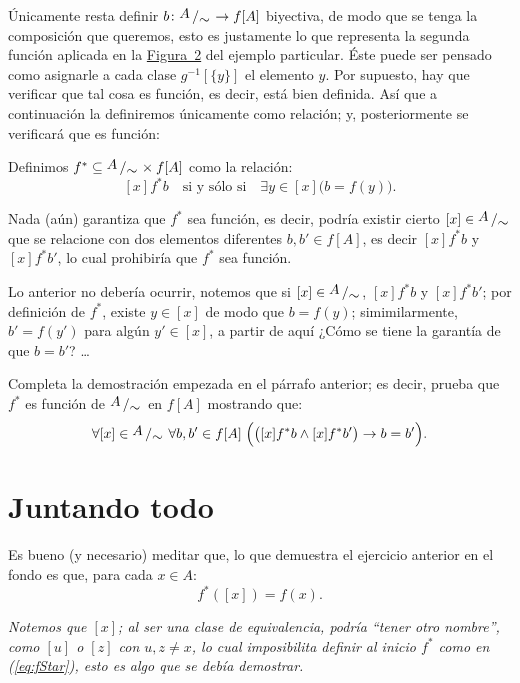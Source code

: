 \documentclass[letterpaper,DIV=14,headsepline,12pt]{scrartcl}
\newcommand{\pts}{}
\newenvironment{ejercicio}[1]{\ifthenelse{\equal{#1}{1} \OR
\equal{#1}{+1}}{\renewcommand{\pts}{\textbf{(#1
pt)}}}{\renewcommand{\pts}{\textbf{(#1 pts)}}}\begin{ejj}\upshape
\pts}{\end{ejj}}
\newcommand{\quot}[2]{{\raisebox{.2em}{$#1$}\left/\raisebox{-.2em}{$#2$}\right.}}
\begin{document}
    Únicamente resta definir $b\colon \quot{A}{\sim} \to f[A]$ biyectiva, de modo que
    se tenga la composición que queremos, esto es justamente lo que representa
    la segunda función aplicada en la \hyperref[fig:g]{Figura~2} del ejemplo
    particular. Éste puede ser pensado como asignarle a cada clase
    $g^{-1}[\{y\}]$ el elemento $y$. Por supuesto, hay que verificar que tal
    cosa es función, es decir, está bien definida. Así que a continuación la
    definiremos únicamente como relación; y, posteriormente se verificará que es
    función:
    \begin{definicion}
        Definimos $f^* \subseteq \quot{A}{\sim} \times f[A]$ como la relación:
        \[  [x] f^* b \quad \text{si y sólo si} \quad \exists y \in [x] \big( b=f(y)
        \big). \]
    \end{definicion}

    Nada (aún) garantiza que $f^*$ sea función, es decir, podría existir cierto
    $[x] \in \quot{A}{\sim}$ que se relacione con dos elementos diferentes $b,b'
    \in f[A]$, es decir $[x] f^* b$ y $[x] f^* b'$, lo cual prohibiría que $f^*$ sea
    función.
    
    Lo anterior no debería ocurrir, notemos que si $[x] \in \quot{A}{\sim}$, $[x]f^* b$
    y $[x]f^* b'$; por definición de $f^*$, existe $y \in [x]$ de modo que $b=f(y)$;
    simimilarmente, $b'=f(y')$ para algún $y'\in[x]$, a partir de aquí ¿Cómo se
    tiene la garantía de que $b=b'$? \dots

    \begin{ejercicio}{1.5}\label{ej:fStar} Completa la demostración empezada en
        el párrafo anterior; es decir, prueba que $f^*$ es función de
        $\quot{A}{\sim}$ en $f[A]$ mostrando que:
        \[ \forall [x] \in \quot{A}{\sim} \; \forall b,b' \in f[A] \; \Big( \big(
        [x] f^* b \land [x] f^* b' \big) \to b=b' \Big). \]
    \end{ejercicio}

    \section*{Juntando todo}

    Es bueno (y necesario) meditar que, lo que demuestra el ejercicio anterior
    en el fondo es que, para cada $x \in A$:
    \begin{equation}\label{eq:fStar}
        f^*([x])=f(x).
    \end{equation}

    \textit{Notemos que $[x]$; al ser una clase de equivalencia, podría ``tener
    otro nombre'', como $[u]$ o $[z]$ con $u,z \neq x$, lo cual imposibilita
    definir al inicio $f^*$ como en (\ref{eq:fStar}), esto es algo que se debía
    demostrar.}
\end{document}
